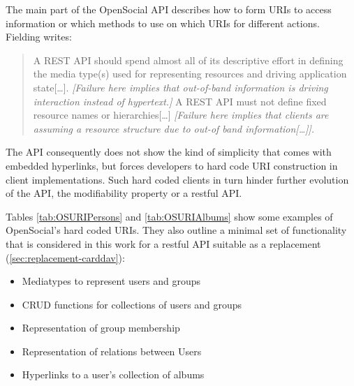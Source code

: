 \documentclass[11pt,a4paper,headsepline,twoside]{scrartcl}		%
\begin{document}
The main part of the OpenSocial API describes how to form URIs to access
information or which methods to use on which URIs for different
actions. Fielding writes:

\begin{quote}
  A REST API should spend almost all of its descriptive effort in defining the
  media type(s) used for representing resources and driving application
  state[\ldots].  \textit{[Failure here implies that out-of-band information is
    driving interaction instead of hypertext.]}  A REST API must not define
  fixed resource names or hierarchies[\ldots] \textit{[Failure here implies that
    clients are assuming a resource structure due to out-of band
    information[\ldots]].}
\end{quote}

The API consequently does not show the kind of simplicity that comes with
embedded hyperlinks, but forces developers to hard code URI construction in
client implementations. Such hard coded clients in turn hinder further evolution
of the API, the modifiability property or a restful API\cite[sec
2.3]{Fielding2000}.

Tables \ref{tab:OSURIPersons} and \ref{tab:OSURIAlbums} show some examples of
OpenSocial's hard coded URIs. They also outline a minimal set of functionality
that is considered in this work for a restful API suitable as a replacement
(\autoref{sec:replacement-carddav}):

\begin{itemize}
\item Mediatypes to represent users and groups
\item CRUD functions for collections of users and groups
\item Representation of group membership
\item Representation of relations between Users
\item Hyperlinks to a user's collection of albums
\end{itemize}
\end{document}
